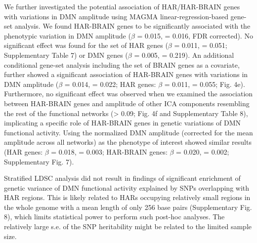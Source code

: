 \begin{refsection}
We further investigated the potential association of HAR/HAR-BRAIN genes with variations in DMN amplitude using MAGMA linear-regression-based gene-set analysis\citep{de2015magma}. We found HAR-BRAIN genes to be significantly associated with the phenotypic variation in DMN amplitude ($\beta$ = 0.015, \pval  = 0.016, FDR corrected). No significant effect was found for the set of HAR genes ($\beta$ = 0.011, \pval = 0.051; Supplementary Table 7) or DMN genes ($\beta$ = 0.005, \pval = 0.219). An additional conditional gene-set analysis \citep{de2018conditional} including the set of BRAIN genes as a covariate, further showed a significant association of HAR-BRAIN genes with variations in DMN amplitude ($\beta$ = 0.014, \pval = 0.022; HAR genes: $\beta$ = 0.011, \pval = 0.055; Fig. 4e). Furthermore, no significant effect was observed when we examined the association between HAR-BRAIN genes and amplitude of other ICA components resembling the rest of the functional networks (\pval > 0.09; Fig. 4f and Supplementary Table 8), implicating a specific role of HAR-BRAIN genes in genetic variations of DMN functional activity. Using the normalized DMN amplitude (corrected for the mean amplitude across all networks) as the phenotype of interest showed similar results (HAR genes: $\beta$ = 0.018, \pval = 0.003; HAR-BRAIN genes: $\beta$ = 0.020, \pval = 0.002; Supplementary Fig. 7).

Stratified LDSC analysis\citep{finucane2015partitioning} did not result in findings of significant enrichment of genetic variance of DMN functional activity explained by SNPs overlapping with HAR regions. This is likely related to HARs occupying relatively small regions in the whole genome with a mean length of only 256 base pairs (Supplementary Fig. 8), which limits statistical power to perform such post-hoc analyses. The relatively large s.e. of the SNP heritability might be related to the limited sample size.


\end{refsection}
